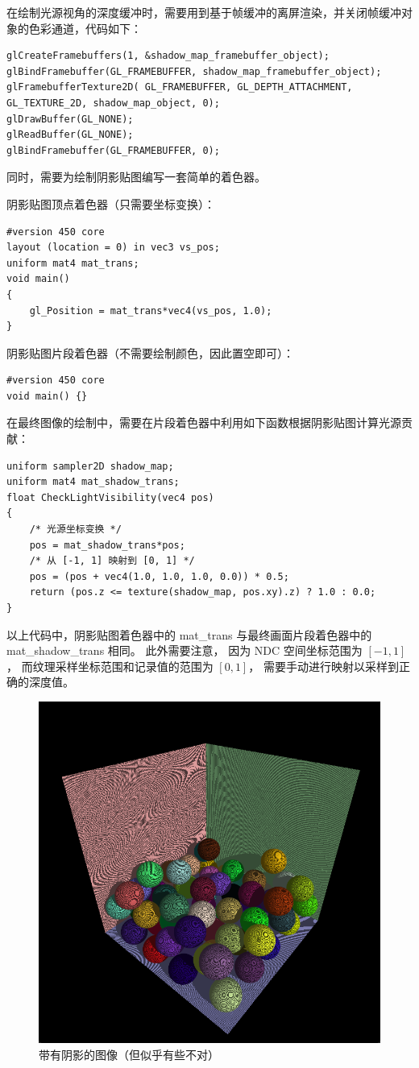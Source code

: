 \documentclass[fontset=windows]{ctexart}
\begin{document}
在绘制光源视角的深度缓冲时，需要用到基于帧缓冲的离屏渲染，并关闭帧缓冲对象的色彩通道，代码如下：
\begin{lstlisting}
glCreateFramebuffers(1, &shadow_map_framebuffer_object);
glBindFramebuffer(GL_FRAMEBUFFER, shadow_map_framebuffer_object);
glFramebufferTexture2D( GL_FRAMEBUFFER, GL_DEPTH_ATTACHMENT,
GL_TEXTURE_2D, shadow_map_object, 0);
glDrawBuffer(GL_NONE);
glReadBuffer(GL_NONE);
glBindFramebuffer(GL_FRAMEBUFFER, 0);
\end{lstlisting}

同时，需要为绘制阴影贴图编写一套简单的着色器。

阴影贴图顶点着色器（只需要坐标变换）：
\begin{lstlisting}
#version 450 core
layout (location = 0) in vec3 vs_pos;
uniform mat4 mat_trans;
void main()
{
    gl_Position = mat_trans*vec4(vs_pos, 1.0);
}
\end{lstlisting}

阴影贴图片段着色器（不需要绘制颜色，因此置空即可）：
\begin{lstlisting}
#version 450 core
void main() {}
\end{lstlisting}

在最终图像的绘制中，需要在片段着色器中利用如下函数根据阴影贴图计算光源贡献：

\begin{lstlisting}
uniform sampler2D shadow_map;
uniform mat4 mat_shadow_trans;
float CheckLightVisibility(vec4 pos)
{
    /* 光源坐标变换 */
    pos = mat_shadow_trans*pos;
    /* 从 [-1, 1] 映射到 [0, 1] */
    pos = (pos + vec4(1.0, 1.0, 1.0, 0.0)) * 0.5;
    return (pos.z <= texture(shadow_map, pos.xy).z) ? 1.0 : 0.0;
}
\end{lstlisting}

以上代码中，阴影贴图着色器中的 mat\_trans 与最终画面片段着色器中的 mat\_shadow\_trans 相同。
此外需要注意，
因为 NDC 空间坐标范围为 $[-1, 1]$，
而纹理采样坐标范围和记录值的范围为 $[0, 1]$，
需要手动进行映射以采样到正确的深度值。

\begin{figure}[htbp]
    \centering
    \includegraphics[width=0.5\linewidth]{imgs/sec 7.1/self-occulusion.png}
    \caption{带有阴影的图像（但似乎有些不对）}
    \label{fig-gl:self-occulusion}
\end{figure}
\end{document}
